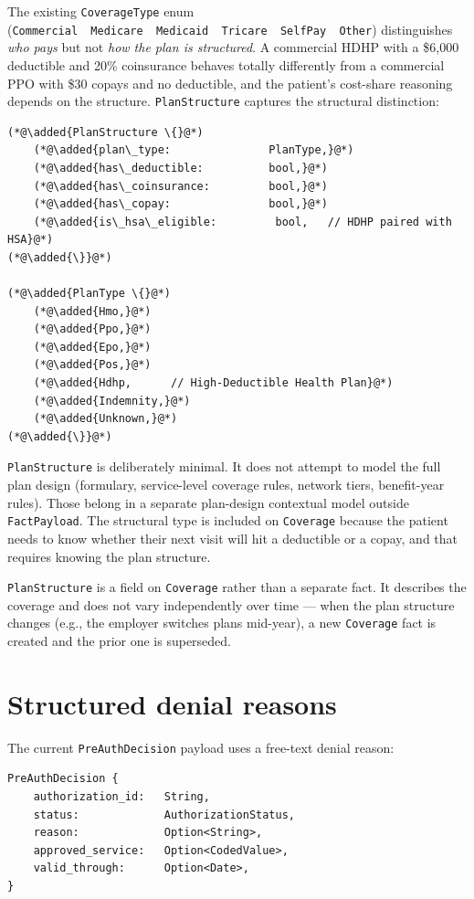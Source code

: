 \documentclass[11pt]{article}
\newcommand{\added}[1]{\textcolor{accentblue}{#1}}
\begin{document}
The existing \texttt{CoverageType} enum
(\texttt{Commercial\ \textbar{}\ Medicare\ \textbar{}\ Medicaid\ \textbar{}\ Tricare\ \textbar{}\ SelfPay\ \textbar{}\ Other})
distinguishes \emph{who pays} but not \emph{how the plan is
structured}. A commercial HDHP with a \$6{,}000 deductible and 20\%
coinsurance behaves totally differently from a commercial PPO with
\$30 copays and no deductible, and the patient's cost-share reasoning
depends on the structure. \texttt{PlanStructure} captures the
structural distinction:

\begin{lstlisting}
(*@\added{PlanStructure \{}@*)
    (*@\added{plan\_type:               PlanType,}@*)
    (*@\added{has\_deductible:          bool,}@*)
    (*@\added{has\_coinsurance:         bool,}@*)
    (*@\added{has\_copay:               bool,}@*)
    (*@\added{is\_hsa\_eligible:         bool,   // HDHP paired with HSA}@*)
(*@\added{\}}@*)

(*@\added{PlanType \{}@*)
    (*@\added{Hmo,}@*)
    (*@\added{Ppo,}@*)
    (*@\added{Epo,}@*)
    (*@\added{Pos,}@*)
    (*@\added{Hdhp,      // High-Deductible Health Plan}@*)
    (*@\added{Indemnity,}@*)
    (*@\added{Unknown,}@*)
(*@\added{\}}@*)
\end{lstlisting}

\texttt{PlanStructure} is deliberately minimal. It does not attempt to
model the full plan design (formulary, service-level coverage rules,
network tiers, benefit-year rules). Those belong in a separate
plan-design contextual model outside \texttt{FactPayload}. The
structural type is included on \texttt{Coverage} because the patient
needs to know whether their next visit will hit a deductible or a
copay, and that requires knowing the plan structure.

\texttt{PlanStructure} is a field on \texttt{Coverage} rather than a
separate fact. It describes the coverage and does not vary
independently over time --- when the plan structure changes (e.g., the
employer switches plans mid-year), a new \texttt{Coverage} fact is
created and the prior one is superseded.

\section{Structured denial reasons}
\label{sec:denial-codes}

The current \texttt{PreAuthDecision} payload uses a free-text denial
reason:

\begin{lstlisting}
PreAuthDecision {
    authorization_id:   String,
    status:             AuthorizationStatus,
    reason:             Option<String>,
    approved_service:   Option<CodedValue>,
    valid_through:      Option<Date>,
}
\end{lstlisting}
\end{document}
